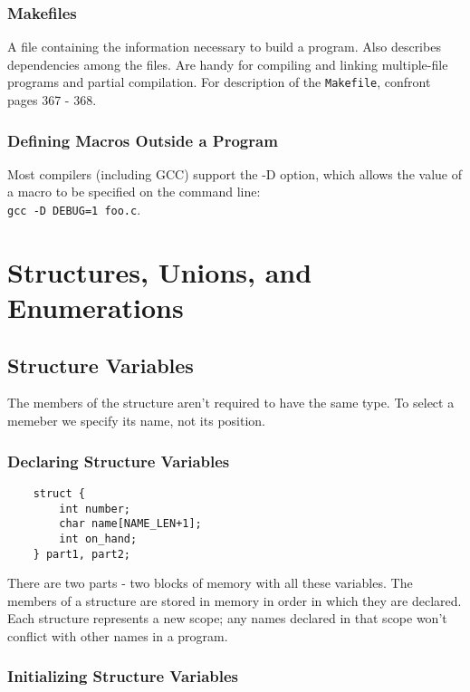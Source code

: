 \documentclass[openany]{book}
\begin{document}
    \subsection*{Makefiles}
    A file containing the information necessary to build a program. Also describes dependencies among the files. Are handy for compiling and linking multiple-file programs and partial compilation. For description of the \texttt{Makefile}, confront pages 367 - 368.

    \subsection*{Defining Macros Outside a Program}
    Most compilers (including GCC) support the -D option, which allows the value of a macro to be specified on the command line: \\
    \texttt{gcc -D DEBUG=1 foo.c}.



    \chapter{Structures, Unions, and Enumerations}

    \section{Structure Variables}
    The members of the structure aren't required to have the same type. To select a memeber we specify its name, not its position.
    
    \subsection*{Declaring Structure Variables}

    \begin{lstlisting}
    struct {
        int number;
        char name[NAME_LEN+1];
        int on_hand;
    } part1, part2;
    \end{lstlisting}

    There are two parts - two blocks of memory with all these variables. The members of a structure are stored in memory in order in which they are declared. Each structure represents a new scope; any names declared in that scope won't conflict with other names in a program. 

    \subsection*{Initializing Structure Variables}
\end{document}
